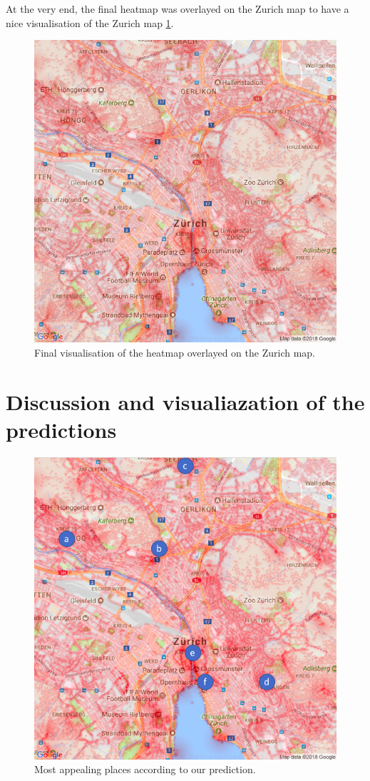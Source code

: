 \documentclass[letterpaper]{article}
\begin{document}
\indent At the very end, the final heatmap was overlayed on the Zurich map to have a nice visualisation of the Zurich map \ref{fig:ZurichVisualization}.

\begin{figure}
    \centering
     \includegraphics[width=.9\linewidth]{images/combined.png}
    \caption{Final visualisation of the heatmap overlayed on the Zurich map.}
    \label{fig:ZurichVisualization}
\end{figure}

\section{Discussion and visualiazation of the predictions}

\begin{figure}[H]
    \centering
     \includegraphics[width=.9\linewidth]{images/good/combined_labeled.png}
    \caption{Most appealing places according to our prediction.}
    \label{fig:NicePlacesLegend}
\end{figure}
\end{document}

